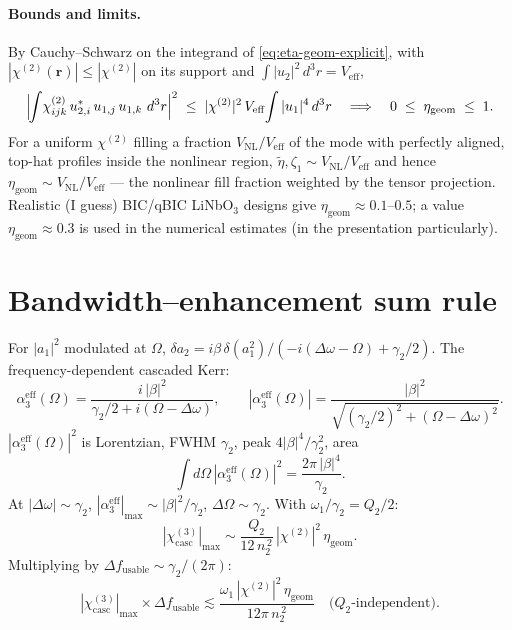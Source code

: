 \documentclass[11pt,a4paper]{article}
\newcommand{\bvec}[1]{\mathbf{#1}}
\newcommand{\ri}{\bvec{r}}
\newcommand{\dthreer}{\,d^{3}r}
\newcommand{\chitwo}{\chi^{(2)}}
\newcommand{\chithree}{\chi^{(3)}}
\newcommand{\Dom}{\Delta\omega}
\begin{document}
\paragraph{Bounds and limits.} By Cauchy--Schwarz on the integrand of
\eqref{eq:eta-geom-explicit}, with $|\chitwo(\ri)|\!\leq\!|\chitwo|$ on its
support and $\int|u_2|^{2}\dthreer=V_\text{eff}$,
\[
  \Bigl|\!\int\!\chitwo_{ijk}\,u_{2,i}^{*}\,u_{1,j}\,u_{1,k}\,\dthreer\Bigr|^{2}
  \;\leq\;
  |\chitwo|^{2}\,V_\text{eff}\!\int|u_{1}|^{4}\dthreer
  \quad\Longrightarrow\quad
  0\;\leq\;\eta_\text{geom}\;\leq\;1.
\]
For a uniform $\chitwo$ filling a fraction $V_\text{NL}/V_\text{eff}$ of the
mode with perfectly aligned, top-hat profiles inside the nonlinear region,
$\widetilde\eta,\zeta_1\sim V_\text{NL}/V_\text{eff}$ and hence
$\eta_\text{geom}\sim V_\text{NL}/V_\text{eff}$ — the nonlinear fill
fraction weighted by the tensor projection. Realistic (I guess) BIC/qBIC LiNbO$_3$
designs give $\eta_\text{geom}\approx 0.1\text{--}0.5$; a value
$\eta_\text{geom}\!\approx\!0.3$ is used in the numerical
estimates (in the presentation particularly).

\section{Bandwidth--enhancement sum rule}\label{sec:sumrule}

For $|a_1|^2$ modulated at $\Omega$, $\delta a_2=i\beta\,\delta(a_1^2)/(-i(\Dom-\Omega)+\gamma_2/2)$. The frequency-dependent cascaded Kerr:
\begin{equation}
  \alpha_3^{\text{eff}}(\Omega)=\frac{i\,|\beta|^{2}}{\gamma_2/2+i(\Omega-\Dom)},
  \qquad
  |\alpha_3^{\text{eff}}(\Omega)|=\frac{|\beta|^{2}}{\sqrt{(\gamma_2/2)^{2}+(\Omega-\Dom)^{2}}}.
  \label{eq:alpha3-AC}
\end{equation}
$|\alpha_3^\text{eff}(\Omega)|^2$ is Lorentzian, FWHM $\gamma_2$, peak $4|\beta|^4/\gamma_2^2$, area
\begin{equation}
  \int\!d\Omega\,|\alpha_3^{\text{eff}}(\Omega)|^{2}=\frac{2\pi\,|\beta|^{4}}{\gamma_2}.
\end{equation}
At $|\Dom|\sim\gamma_2$, $|\alpha_3^\text{eff}|_\text{max}\sim|\beta|^2/\gamma_2$, $\Delta\Omega\sim\gamma_2$. With $\omega_1/\gamma_2=Q_2/2$:
\begin{equation}
  |\chithree_\text{casc}|_\text{max}\sim
       \frac{Q_2}{12\,n_2^{\,2}}\,|\chitwo|^2\,\eta_\text{geom}.
  \label{eq:chi3-max}
\end{equation}
Multiplying by $\Delta f_\text{usable}\sim\gamma_2/(2\pi)$:
\begin{equation}
  \boxed{\;|\chithree_\text{casc}|_\text{max}\times\Delta f_\text{usable}
          \lesssim\frac{\omega_1\,|\chitwo|^2\,\eta_\text{geom}}{12\pi\,n_2^{\,2}}
          \quad\text{($Q_2$-independent)}.\;}
  \label{eq:sum-rule}
\end{equation}
\end{document}
